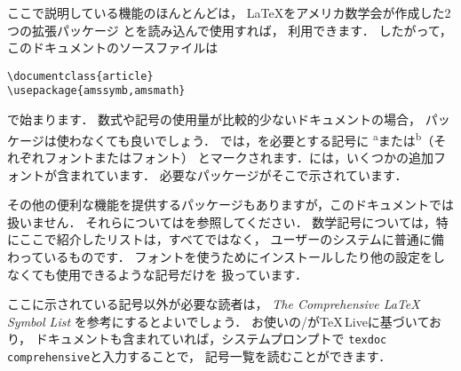 ここで説明している機能のほんとんどは，
\LaTeX{}をアメリカ数学会が作成した2つの拡張パッケージ
とを読み込んで使用すれば，
利用できます．
したがって，このドキュメントのソースファイルは
\begin{verbatim}
\documentclass{article}
\usepackage{amssymb,amsmath}
\end{verbatim}
で始まります．
数式や記号の使用量が比較的少ないドキュメントの場合，
パッケージは使わなくても良いでしょう．
では，を必要とする記号に
\textsuperscript{a}または\textsuperscript{b}（それぞれフォントまたはフォント）
とマークされます．には，いくつかの追加フォントが含まれています．
必要なパッケージがそこで示されています．

その他の便利な機能を提供するパッケージもありますが，このドキュメントでは扱いません．
それらについてはを参照してください．
数学記号については，特にここで紹介したリストは，すべてではなく，
ユーザーの\lat{}システムに普通に備わっているものです．
フォントを使うためにインストールしたり他の設定をしなくても使用できるような記号だけを
扱っています．


ここに示されている記号以外が必要な読者は，
\emph{The Comprehensive \LaTeX{} Symbol List}
\cite{comprehensive}を参考にするとよいでしょう．
お使いの\lat/が\TeX\,Liveに基づいており，
ドキュメントも含まれていれば，システムプロンプトで
\texttt{texdoc comprehensive}と入力することで，
記号一覧を読むことができます．

